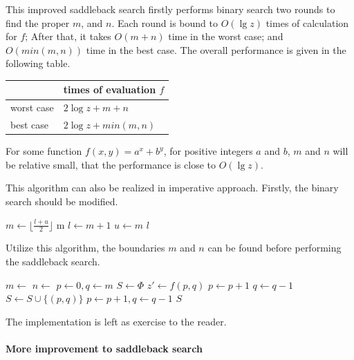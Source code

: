 \documentclass[UTF8]{article}
\begin{document}
This improved saddleback search firstly performs binary search two rounds to find the proper $m$, and $n$.
Each round is bound to $O(\lg z)$ times of calculation for $f$; After that, it takes $O(m + n)$
time in the worst case; and $O(min(m, n))$ time in the best case. The overall performance is
given in the following table.

\begin{tabular}{|l|l|}
\hline
 & times of evaluation $f$ \\
\hline
worst case & $2 \log z + m + n$ \\
best case & $2 \log z + min(m, n)$ \\
\hline
\end{tabular}

For some function $f(x, y) = a^x + b^y$, for positive integers $a$ and $b$, $m$ and $n$ will be
relative small, that the performance is close to $O(\lg z)$.

This algorithm can also be realized in imperative approach. Firstly, the binary search should be modified.

\begin{algorithmic}[1]
    \State $m \gets \lfloor \frac{l + u}{2} \rfloor$
        \State \Return m
      \EndIf
      \State $l \gets m + 1$
    \Else
      \State $u \gets m$
    \EndIf
  \EndWhile
  \State \Return $l$
\EndFunction
\end{algorithmic}

Utilize this algorithm, the boundaries $m$ and $n$ can be found before performing the saddleback search.

\begin{algorithmic}[1]
  \State $m \gets$ 
  \State $n \gets$ 
  \State $p \gets 0, q \gets m$
  \State $S \gets \Phi$
    \State $z' \gets f(p, q)$
      \State $p \gets p + 1$
      \State $q \gets q - 1$
    \Else
      \State $S \gets S \cup \{(p, q)\}$
      \State $p \gets p + 1, q \gets q - 1$
    \EndIf
  \EndWhile
  \State \Return $S$
\EndFunction
\end{algorithmic}

The implementation is left as exercise to the reader.

\paragraph{More improvement to saddleback search}
\end{document}

